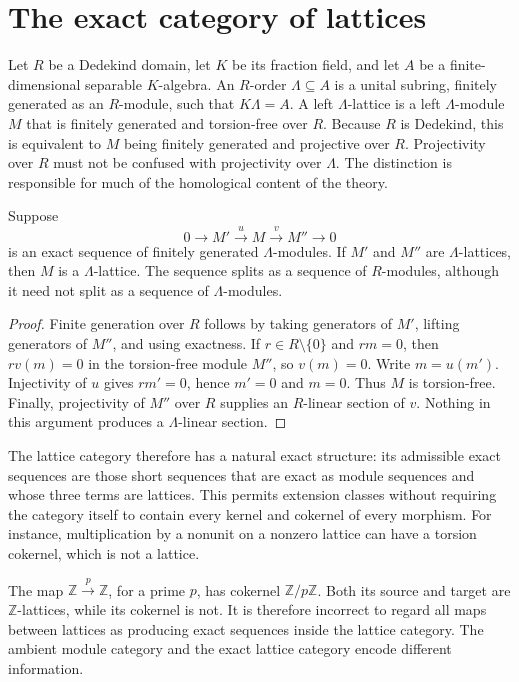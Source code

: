 \section{The exact category of lattices}

Let $R$ be a Dedekind domain, let $K$ be its fraction field, and let $A$ be a finite-dimensional separable $K$-algebra. An $R$-order $\Lambda\subseteq A$ is a unital subring, finitely generated as an $R$-module, such that $K\Lambda=A$. A left $\Lambda$-lattice is a left $\Lambda$-module $M$ that is finitely generated and torsion-free over $R$. Because $R$ is Dedekind, this is equivalent to $M$ being finitely generated and projective over $R$. Projectivity over $R$ must not be confused with projectivity over $\Lambda$. The distinction is responsible for much of the homological content of the theory.\cite{v2Roggenkamp1970II}

\begin{proposition}
Suppose
\[
0\longrightarrow M'\xrightarrow{u}M\xrightarrow{v}M''\longrightarrow0
\]
is an exact sequence of finitely generated $\Lambda$-modules. If $M'$ and $M''$ are $\Lambda$-lattices, then $M$ is a $\Lambda$-lattice. The sequence splits as a sequence of $R$-modules, although it need not split as a sequence of $\Lambda$-modules.
\end{proposition}
\begin{proof}
Finite generation over $R$ follows by taking generators of $M'$, lifting generators of $M''$, and using exactness. If $r\in R\setminus\{0\}$ and $rm=0$, then $r v(m)=0$ in the torsion-free module $M''$, so $v(m)=0$. Write $m=u(m')$. Injectivity of $u$ gives $rm'=0$, hence $m'=0$ and $m=0$. Thus $M$ is torsion-free. Finally, projectivity of $M''$ over $R$ supplies an $R$-linear section of $v$. Nothing in this argument produces a $\Lambda$-linear section.
\end{proof}

The lattice category therefore has a natural exact structure: its admissible exact sequences are those short sequences that are exact as module sequences and whose three terms are lattices. This permits extension classes without requiring the category itself to contain every kernel and cokernel of every morphism. For instance, multiplication by a nonunit on a nonzero lattice can have a torsion cokernel, which is not a lattice.

\begin{example}
The map $\mathbb Z\xrightarrow{\,p\,}\mathbb Z$, for a prime $p$, has cokernel $\mathbb Z/p\mathbb Z$. Both its source and target are $\mathbb Z$-lattices, while its cokernel is not. It is therefore incorrect to regard all maps between lattices as producing exact sequences inside the lattice category. The ambient module category and the exact lattice category encode different information.
\end{example}

